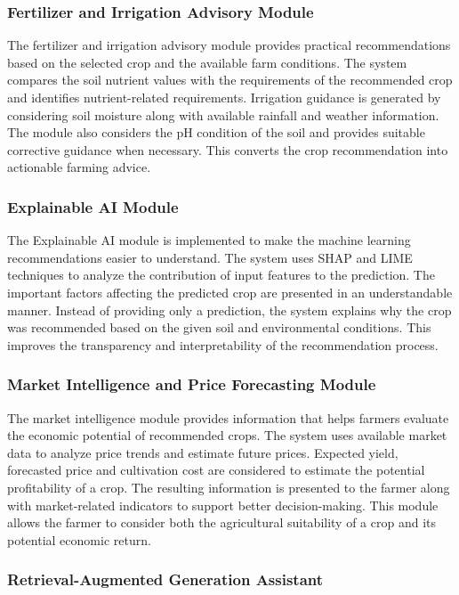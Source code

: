 \subsubsection{Fertilizer and Irrigation Advisory Module}

The fertilizer and irrigation advisory module provides practical recommendations based on the selected crop and the available farm conditions. The system compares the soil nutrient values with the requirements of the recommended crop and identifies nutrient-related requirements. Irrigation guidance is generated by considering soil moisture along with available rainfall and weather information. The module also considers the pH condition of the soil and provides suitable corrective guidance when necessary. This converts the crop recommendation into actionable farming advice.

\subsubsection{Explainable AI Module}

The Explainable AI module is implemented to make the machine learning recommendations easier to understand. The system uses SHAP and LIME techniques to analyze the contribution of input features to the prediction. The important factors affecting the predicted crop are presented in an understandable manner. Instead of providing only a prediction, the system explains why the crop was recommended based on the given soil and environmental conditions. This improves the transparency and interpretability of the recommendation process.

\subsubsection{Market Intelligence and Price Forecasting Module}

The market intelligence module provides information that helps farmers evaluate the economic potential of recommended crops. The system uses available market data to analyze price trends and estimate future prices. Expected yield, forecasted price and cultivation cost are considered to estimate the potential profitability of a crop. The resulting information is presented to the farmer along with market-related indicators to support better decision-making. This module allows the farmer to consider both the agricultural suitability of a crop and its potential economic return.

\subsubsection{Retrieval-Augmented Generation Assistant}


